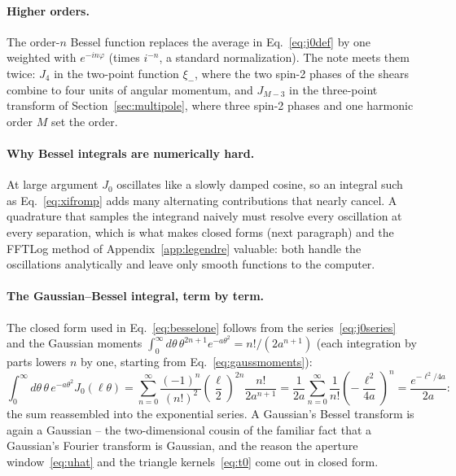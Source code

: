\documentclass[11pt]{article}
\numberwithin{equation}{section}
\begin{document}
\paragraph{Higher orders.}
The order-$n$ Bessel function replaces the average in
Eq.~\eqref{eq:j0def} by one weighted with $e^{-in\varphi}$ (times
$i^{-n}$, a standard normalization).  The note meets them twice:
$J_4$ in the two-point function $\xi_-$, where the two spin-2
phases of the shears combine to four units of angular momentum, and
$J_{M-3}$ in the three-point transform of
Section~\ref{sec:multipole}, where three spin-2 phases and one
harmonic order $M$ set the order.

\paragraph{Why Bessel integrals are numerically hard.}
At large argument $J_0$ oscillates like a slowly damped cosine, so
an integral such as Eq.~\eqref{eq:xifromp} adds many alternating
contributions that nearly cancel.  A quadrature that samples the
integrand naively must resolve every oscillation at every
separation, which is what makes closed forms (next paragraph) and
the FFTLog method of Appendix~\ref{app:legendre} valuable: both
handle the oscillations analytically and leave only smooth
functions to the computer.

\paragraph{The Gaussian--Bessel integral, term by term.}
The closed form used in Eq.~\eqref{eq:besselone} follows from the
series~\eqref{eq:j0series} and the Gaussian moments
$\int_0^\infty d\theta\,\theta^{2n+1} e^{-a\theta^2} =
n!/(2a^{n+1})$ (each integration by parts lowers $n$ by one,
starting from Eq.~\eqref{eq:gaussmoments}):
\begin{equation}
  \int_0^\infty d\theta\,\theta\, e^{-a\theta^2} J_0(\ell\theta)
  = \sum_{n=0}^\infty \frac{(-1)^n}{(n!)^2}
  \left(\frac{\ell}{2}\right)^{2n}
  \frac{n!}{2 a^{n+1}}
  = \frac{1}{2a} \sum_{n=0}^\infty
  \frac{1}{n!}\left(-\frac{\ell^2}{4a}\right)^{n}
  = \frac{e^{-\ell^2/4a}}{2a} :
  \label{eq:gaussbessel}
\end{equation}
the sum reassembled into the exponential series.  A Gaussian's
Bessel transform is again a Gaussian -- the two-dimensional cousin
of the familiar fact that a Gaussian's Fourier transform is
Gaussian, and the reason the aperture window~\eqref{eq:uhat} and
the triangle kernels~\eqref{eq:t0} come out in closed form.
\end{document}
